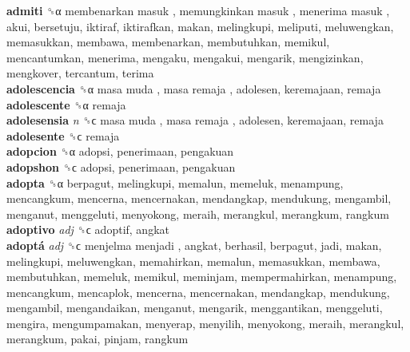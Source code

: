 \textbf{admiti} ␝α   membenarkan masuk ,  memungkinkan masuk ,  menerima masuk , akui, bersetuju, iktiraf, iktirafkan, makan, melingkupi, meliputi, meluwengkan, memasukkan, membawa, membenarkan, membutuhkan, memikul, mencantumkan, menerima, mengaku, mengakui, mengarik, mengizinkan, mengkover, tercantum, terima  \\
\textbf{adolescencia} ␝α   masa muda ,  masa remaja , adolesen, keremajaan, remaja  \\
\textbf{adolescente} ␝α  remaja  \\
\textbf{adolesensia} \emph{n}  ␝ϲ   masa muda ,  masa remaja , adolesen, keremajaan, remaja  \\
\textbf{adolesente} ␝ϲ  remaja  \\
\textbf{adopcion} ␝α  adopsi, penerimaan, pengakuan  \\
\textbf{adopshon} ␝ϲ  adopsi, penerimaan, pengakuan  \\
\textbf{adopta} ␝α  berpagut, melingkupi, memalun, memeluk, menampung, mencangkum, mencerna, mencernakan, mendangkap, mendukung, mengambil, menganut, menggeluti, menyokong, meraih, merangkul, merangkum, rangkum  \\
\textbf{adoptivo} \emph{adj}  ␝ϲ  adoptif, angkat  \\
\textbf{adoptá} \emph{adj}  ␝ϲ   menjelma menjadi , angkat, berhasil, berpagut, jadi, makan, melingkupi, meluwengkan, memahirkan, memalun, memasukkan, membawa, membutuhkan, memeluk, memikul, meminjam, mempermahirkan, menampung, mencangkum, mencaplok, mencerna, mencernakan, mendangkap, mendukung, mengambil, mengandaikan, menganut, mengarik, menggantikan, menggeluti, mengira, mengumpamakan, menyerap, menyilih, menyokong, meraih, merangkul, merangkum, pakai, pinjam, rangkum  \\
